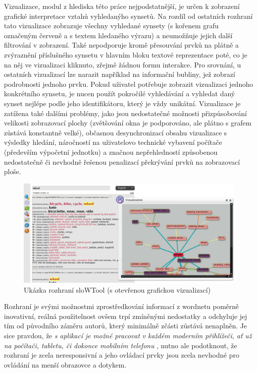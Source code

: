 \documentclass[a4paper, 11pt, oneside]{book}
\begin{document}
					Vizualizace, modul z hlediska této práce nejpodstatnější, je určen k zobrazení grafické interpretace vztahů vyhledanýho synsetů. Na rozdíl od ostatních rozhraní tato vizualizace zobrazuje všechny vyhledané synsety (s kořenem grafu označeným červeně a s textem hledaného výrazu) a neumožňuje jejich další filtrování v zobrazení. Také nepodporuje kromě přesouvání prvků na plátně a zvýraznění příslušného synsetu v hlavním bloku textové reprezentace poté, co je na něj ve vizualizaci kliknuto, zřejmě žádnou formu interakce. Pro srovnání, u ostatních vizualizací lze narazit například na informační bubliny, jež zobrazí podrobnosti jednoho prvku. Pokud uživatel potřebuje zobrazit vizualizaci jednoho konkrétního synsetu, je nucen použít pokročilé vyhledávání a vyhledat daný synset nejlépe podle jeho identifikátoru, který je vždy unikátní. Vizualizace je zatížena také dalšími problémy, jako jsou nedostatečné možnosti přizpůsobování velikosti zobrazovací plochy (zvětšování okna je podporováno, ale plátno s grafem zůstává konstantně velké), občasnou desynchronizací obsahu vizualizace s výsledky hledání, náročností na uživatelovo technické vybavení počítače (především výpočetní jednotku) a značnou nepřehledností způsobenou nedostatečně či nevhodně řešenou penalizací překrývání prvků na zobrazovací ploše. 

					\begin{figure}[h]
						\centering
						\includegraphics[width=1.0\textwidth]{slowtool.png}
						\caption{Ukázka rozhraní sloWTool (s otevřenou grafickou vizualizací)}
						\label{fig:slowtool}
					\end{figure}

					Rozhraní je svými možnostmi zprostředkování informací z wordnetu poměrně inovativní, reálná použitelnost ovšem trpí zmíněnými nedostatky a odchyluje jej tím od původního záměru autorů, který minimálně zčásti zůstává nenaplněn. Je sice pravdou, že \textit{s aplikací je možné pracovat v každém moderním přihlížeči, ať už na počítači, tabletu, či dokonce mobilním telefonu} \parencite{fivser2011visualizing}, nutno ale podotknout, že rozhraní je zcela neresponsivní a jeho ovládací prvky jsou zcela nevhodné pro ovládání na menší obrazovce a dotykem.
\end{document}
